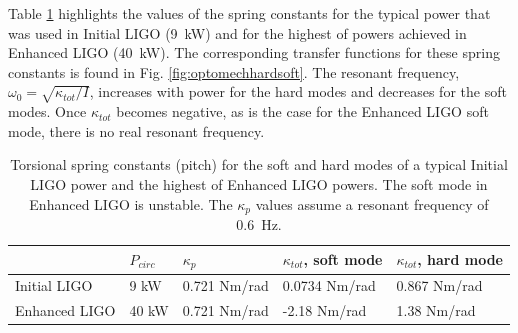 Table \ref{table:k_tot} highlights the values of the spring constants
for the typical power that was used in Initial LIGO (9~kW) and for the
highest of powers achieved in Enhanced LIGO (40~kW). The corresponding
transfer functions for these spring constants is found in
Fig. \ref{fig:optomechhardsoft}. The resonant frequency, $\omega_0 =
\sqrt{\kappa_{tot}/I}$, increases with power for the hard modes and
decreases for the soft modes. Once $\kappa_{tot}$ becomes negative, as
is the case for the Enhanced LIGO soft mode, there is no real resonant
frequency.


\begin{table}
\centering
\caption[Torsional spring constants for the soft and hard cavity modes]{Torsional spring constants (pitch) for the soft and hard modes of a typical
  Initial LIGO power and the highest of Enhanced LIGO powers. The soft
  mode in Enhanced LIGO is unstable. The $\kappa_p$ values assume a
  resonant frequency of 0.6~Hz.}
\begin{tabular}{l l l l l}
\hline
 & $P_{circ}$ & $\kappa_{p}$ & $\kappa_{tot}$, soft mode &
 $\kappa_{tot}$, hard mode\\
\hline
Initial LIGO & 9 kW & 0.721 Nm/rad& 0.0734 Nm/rad & 0.867 Nm/rad\\
Enhanced LIGO & 40 kW & 0.721 Nm/rad& -2.18 Nm/rad & 1.38 Nm/rad\\
\hline
\end{tabular}
\label{table:k_tot}
\end{table}


